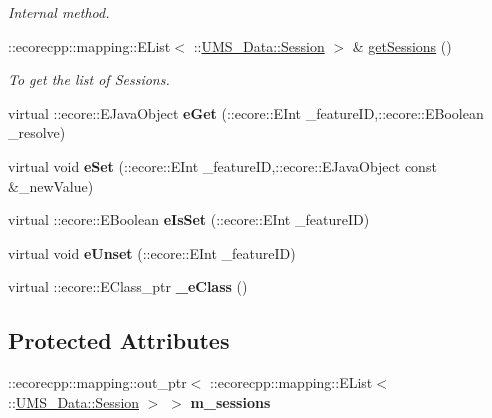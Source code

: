 \begin{DoxyCompactItemize}
\begin{DoxyCompactList}\small\item\em Internal method. \item\end{DoxyCompactList}\item 
::ecorecpp::mapping::EList$<$ ::\hyperlink{classUMS__Data_1_1Session}{UMS\_\-Data::Session} $>$ \& \hyperlink{classUMS__Data_1_1ListSessions_a641b154b0ef2f7f2313b37571741ccad}{getSessions} ()
\begin{DoxyCompactList}\small\item\em To get the list of Sessions. \item\end{DoxyCompactList}\item 
\hypertarget{classUMS__Data_1_1ListSessions_a23f1c643f5d7c24b5799e7eedf8e0f0c}{
virtual ::ecore::EJavaObject {\bfseries eGet} (::ecore::EInt \_\-featureID,::ecore::EBoolean \_\-resolve)}
\label{classUMS__Data_1_1ListSessions_a23f1c643f5d7c24b5799e7eedf8e0f0c}

\item 
\hypertarget{classUMS__Data_1_1ListSessions_a7255ea2e533ffa097fed908c9c65c84b}{
virtual void {\bfseries eSet} (::ecore::EInt \_\-featureID,::ecore::EJavaObject const \&\_\-newValue)}
\label{classUMS__Data_1_1ListSessions_a7255ea2e533ffa097fed908c9c65c84b}

\item 
\hypertarget{classUMS__Data_1_1ListSessions_adf91599d0397255c552b989181ae799a}{
virtual ::ecore::EBoolean {\bfseries eIsSet} (::ecore::EInt \_\-featureID)}
\label{classUMS__Data_1_1ListSessions_adf91599d0397255c552b989181ae799a}

\item 
\hypertarget{classUMS__Data_1_1ListSessions_ac215439cfe300606788085c09e5d8a7d}{
virtual void {\bfseries eUnset} (::ecore::EInt \_\-featureID)}
\label{classUMS__Data_1_1ListSessions_ac215439cfe300606788085c09e5d8a7d}

\item 
\hypertarget{classUMS__Data_1_1ListSessions_ad67e135066df5d640d5d8d49a6d15522}{
virtual ::ecore::EClass\_\-ptr {\bfseries \_\-eClass} ()}
\label{classUMS__Data_1_1ListSessions_ad67e135066df5d640d5d8d49a6d15522}

\end{DoxyCompactItemize}
\subsection*{Protected Attributes}
\begin{DoxyCompactItemize}
\item 
\hypertarget{classUMS__Data_1_1ListSessions_a7b8fb3d67a289828688a102feada6562}{
::ecorecpp::mapping::out\_\-ptr$<$ ::ecorecpp::mapping::EList$<$ ::\hyperlink{classUMS__Data_1_1Session}{UMS\_\-Data::Session} $>$ $>$ {\bfseries m\_\-sessions}}
\label{classUMS__Data_1_1ListSessions_a7b8fb3d67a289828688a102feada6562}

\end{DoxyCompactItemize}


